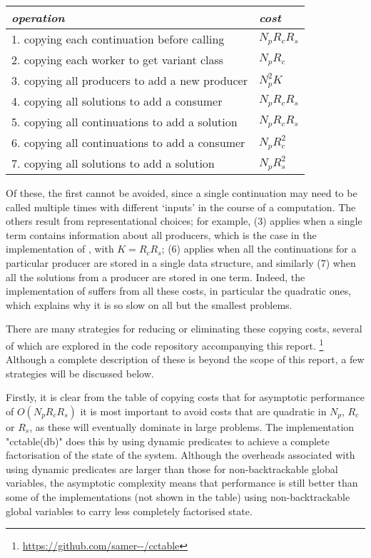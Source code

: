 \begin{center}
\begin{tabular}{ll}
  \emph{operation} & \emph{cost} \\
  \hline
  1. copying each continuation before calling    & $N_p R_c R_s$ \\
  2. copying each worker to get variant class    & $N_p R_c$ \\
  3. copying all producers to add a new producer & $N_p^2 K $ \\
  4. copying all solutions to add a consumer     & $N_p R_c R_s$ \\
  5. copying all continuations to add a solution & $N_p R_c R_s$ \\
  6. copying all continuations to add a consumer & $N_p R_c^2$ \\
  7. copying all solutions to add a solution     & $N_p R_s^2$ \\
\end{tabular}
\end{center}
%
Of these, the first cannot be avoided, since a single continuation may need to
be called multiple times with different `inputs' in the course of a computation.
The others result from representational choices; for example, (3) applies when
a single term contains information about all producers, which is the case
in the implementation of , with $K = R_c R_s$; (6) applies
when all the continuations for a particular producer are stored in a single
data structure, and similarly (7) when all the solutions from a producer are
stored in one term. Indeed, the implementation of  suffers from
all these costs, in particular the quadratic ones, which explains why it is so slow
on all but the smallest problems.

There are many strategies for reducing or eliminating these copying costs,
several of which are explored in the code repository accompanying this report.%
\footnote{\url{https://github.com/samer--/cctable}}
Although a complete description of these is beyond the scope of this report, a few
strategies will be discussed below.

Firstly, it is clear from the table of copying costs that for asymptotic 
performance of $O(N_p R_c R_s)$ it is most important to avoid costs that are quadratic 
in $N_p$, $R_c$ or $R_s$, as these will eventually dominate in large problems.
The implementation "cctable(db)" does this by using dynamic predicates 
to achieve a complete factorisation of the state of
the system. Although the overheads associated with using dynamic predicates are larger
than those for non-backtrackable global variables, the asymptotic complexity means
that performance is still better than some of the implementations (not shown in the table)
using non-backtrackable global variables to carry less completely factorised state.

